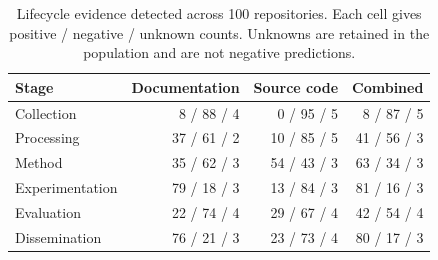 \begin{table}[t]
\centering
\caption{Lifecycle evidence detected across 100 repositories. Each cell gives positive / negative / unknown counts. Unknowns are retained in the population and are not negative predictions.}
\label{tab:benchmark-100}
\begin{tabular}{lrrr}
\toprule
Stage & Documentation & Source code & Combined \\
\midrule
Collection & 8 / 88 / 4 & 0 / 95 / 5 & 8 / 87 / 5 \\
Processing & 37 / 61 / 2 & 10 / 85 / 5 & 41 / 56 / 3 \\
Method & 35 / 62 / 3 & 54 / 43 / 3 & 63 / 34 / 3 \\
Experimentation & 79 / 18 / 3 & 13 / 84 / 3 & 81 / 16 / 3 \\
Evaluation & 22 / 74 / 4 & 29 / 67 / 4 & 42 / 54 / 4 \\
Dissemination & 76 / 21 / 3 & 23 / 73 / 4 & 80 / 17 / 3 \\
\bottomrule
\end{tabular}
\end{table}
